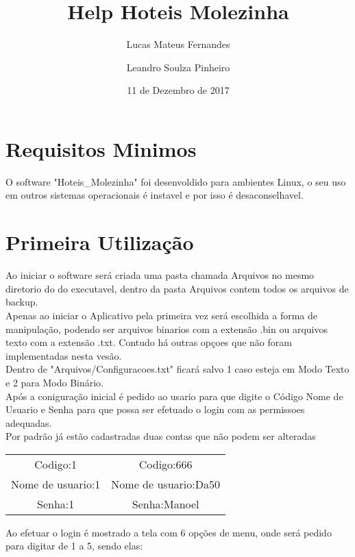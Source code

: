 \documentclass[titlepage]{article}
\title{Help Hoteis Molezinha}
\date{11 de Dezembro de 2017}
\author{Lucas Mateus Fernandes \and Leandro Soulza Pinheiro}
\begin{document}
	\maketitle
	\newpage
	\tableofcontents %
	\newpage

				\section{Requisitos Minimos}
					O software "Hoteis\_Molezinha" foi desenvoldido para ambientes Linux, o seu uso em outros sistemas operacionais é instavel e por isso é desaconselhavel.
				\section{Primeira Utilização}
					Ao iniciar o software será criada uma pasta chamada Arquivos no mesmo diretorio do do executavel, dentro  da pasta Arquivos contem todos os arquivos de backup.\\
					Apenas ao iniciar o Aplicativo pela primeira vez será escolhida a forma de manipulação, podendo ser arquivos binarios com a extensão .bin ou arquivos texto com a extensão .txt. Contudo há outras opçoes que não foram implementadas nesta vesão.\\
					Dentro de "Arquivos/Configuracoes.txt" ficará salvo 1 caso esteja em Modo Texto e 2 para Modo Binário.\\
					Após a coniguração inicial é pedido ao usario para que digite o Código Nome de Usuario e Senha para que possa ser efetuado o login com as permissoes adequadas.\\
					Por padrão já estão cadastradas duas contas que não podem ser alteradas\\

				
					\begin{table}[h]
						\begin{center}
							\begin{tabular}{|c|c|}
								\hline
									Codigo:1&Codigo:666\\
									Nome de usuario:1&Nome de usuario:Da50\\
									Senha:1&Senha:Manoel\\
								\hline
							\end{tabular}
						\end{center}
					\end{table}
				

				Ao efetuar o login é mostrado a tela com 6 opções de menu, onde será pedido para digitar de 1 a 5, sendo elas:
\end{document}
